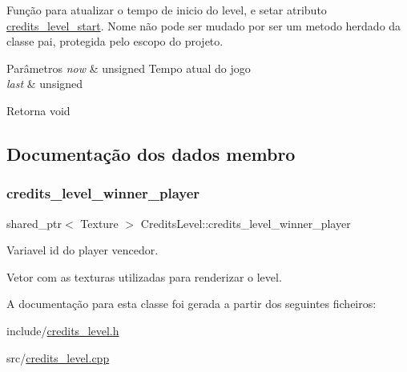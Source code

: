 Função para atualizar o tempo de inicio do level, e setar atributo \mbox{\hyperlink{classCreditsLevel_ab7ac1647d977be5650daee20614bdede}{credits\+\_\+level\+\_\+start}}. Nome não pode ser mudado por ser um metodo herdado da classe pai, protegida pelo escopo do projeto. 


\begin{DoxyParams}{Parâmetros}
{\em now} & unsigned Tempo atual do jogo \\
\hline
{\em last} & unsigned \\
\hline
\end{DoxyParams}
\begin{DoxyReturn}{Retorna}
void 
\end{DoxyReturn}


\subsection{Documentação dos dados membro}
\mbox{\label{classCreditsLevel_af25e3be232ccdb229faa00e7114d54e1}} 
\subsubsection{\texorpdfstring{credits\+\_\+level\+\_\+winner\+\_\+player}{credits\_level\_winner\_player}}
{\footnotesize\ttfamily shared\+\_\+ptr$<$ Texture $>$ Credits\+Level\+::credits\+\_\+level\+\_\+winner\+\_\+player\hspace{0.3cm}{\ttfamily [private]}}



Variavel id do player vencedor. 

Vetor com as texturas utilizadas para renderizar o level. 

A documentação para esta classe foi gerada a partir dos seguintes ficheiros\+:\begin{DoxyCompactItemize}
\item 
include/\mbox{\hyperlink{credits__level_8h}{credits\+\_\+level.\+h}}\item 
src/\mbox{\hyperlink{credits__level_8cpp}{credits\+\_\+level.\+cpp}}\end{DoxyCompactItemize}
